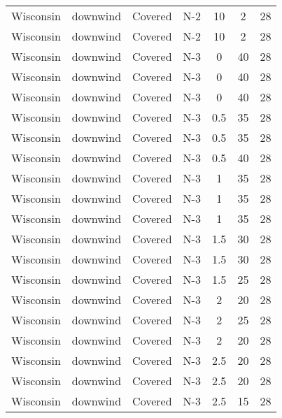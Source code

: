 \documentclass{article}
\begin{document}
\begin{longtable}[c]{ccccccc}
Wisconsin & downwind  & Covered     & N-2             & 10           & 2           & 28  \\
Wisconsin & downwind  & Covered     & N-2             & 10           & 2           & 28  \\
Wisconsin & downwind  & Covered     & N-3             & 0            & 40          & 28  \\
Wisconsin & downwind  & Covered     & N-3             & 0            & 40          & 28  \\
Wisconsin & downwind  & Covered     & N-3             & 0            & 40          & 28  \\
Wisconsin & downwind  & Covered     & N-3             & 0.5          & 35          & 28  \\
Wisconsin & downwind  & Covered     & N-3             & 0.5          & 35          & 28  \\
Wisconsin & downwind  & Covered     & N-3             & 0.5          & 40          & 28  \\
Wisconsin & downwind  & Covered     & N-3             & 1            & 35          & 28  \\
Wisconsin & downwind  & Covered     & N-3             & 1            & 35          & 28  \\
Wisconsin & downwind  & Covered     & N-3             & 1            & 35          & 28  \\
Wisconsin & downwind  & Covered     & N-3             & 1.5          & 30          & 28  \\
Wisconsin & downwind  & Covered     & N-3             & 1.5          & 30          & 28  \\
Wisconsin & downwind  & Covered     & N-3             & 1.5          & 25          & 28  \\
Wisconsin & downwind  & Covered     & N-3             & 2            & 20          & 28  \\
Wisconsin & downwind  & Covered     & N-3             & 2            & 25          & 28  \\
Wisconsin & downwind  & Covered     & N-3             & 2            & 20          & 28  \\
Wisconsin & downwind  & Covered     & N-3             & 2.5          & 20          & 28  \\
Wisconsin & downwind  & Covered     & N-3             & 2.5          & 20          & 28  \\
Wisconsin & downwind  & Covered     & N-3             & 2.5          & 15          & 28  \\

\end{longtable}
\end{document}
